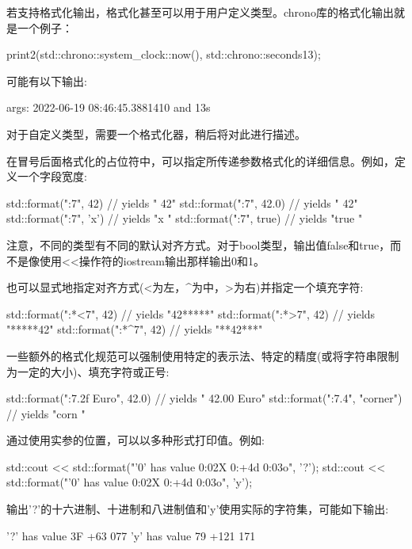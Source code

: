 若支持格式化输出，格式化甚至可以用于用户定义类型。chrono库的格式化输出就是一个例子：

\begin{cpp}
print2(std::chrono::system_clock::now(), std::chrono::seconds{13});
\end{cpp}

可能有以下输出:

\begin{shell}
args: 2022-06-19 08:46:45.3881410 and 13s
\end{shell}

对于自定义类型，需要一个格式化器，稍后将对此进行描述。

在冒号后面格式化的占位符中，可以指定所传递参数格式化的详细信息。例如，定义一个字段宽度:

\begin{cpp}
std::format("{:7}", 42) // yields " 42"
std::format("{:7}", 42.0) // yields " 42"
std::format("{:7}", 'x') // yields "x "
std::format("{:7}", true) // yields "true "
\end{cpp}

注意，不同的类型有不同的默认对齐方式。对于bool类型，输出值false和true，而不是像使用<{}<操作符的iostream输出那样输出0和1。

也可以显式地指定对齐方式(<为左，\^{}为中，>为右)并指定一个填充字符:

\begin{cpp}
std::format("{:*<7}", 42) // yields "42*****"
std::format("{:*>7}", 42) // yields "*****42"
std::format("{:*^7}", 42) // yields "**42***"
\end{cpp}

一些额外的格式化规范可以强制使用特定的表示法、特定的精度(或将字符串限制为一定的大小)、填充字符或正号:

\begin{cpp}
std::format("{:7.2f} Euro", 42.0) // yields " 42.00 Euro"
std::format("{:7.4}", "corner") // yields "corn "
\end{cpp}

通过使用实参的位置，可以以多种形式打印值。例如:

\begin{cpp}
std::cout << std::format("'{0}' has value {0:02X} {0:+4d} {0:03o}\n", '?');
std::cout << std::format("'{0}' has value {0:02X} {0:+4d} {0:03o}\n", 'y');
\end{cpp}

输出'?'的十六进制、十进制和八进制值和'y'使用实际的字符集，可能如下输出:

\begin{shell}
’?’ has value 3F +63 077
’y’ has value 79 +121 171
\end{shell}

